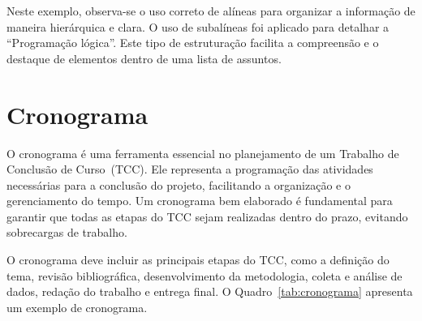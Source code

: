 \documentclass[
    12pt
    ,oneside
    ,a4paper
    ,chapter=TITLE
    ,section=TITLE
    ,sumario=abnt-6027-2012]{abntex2}
\begin{document}
Neste exemplo, observa-se o uso correto de alíneas para organizar a informação de maneira hierárquica e clara. O uso de subalíneas foi aplicado para detalhar a ``Programação lógica''. Este tipo de estruturação facilita a compreensão e o destaque de elementos dentro de uma lista de assuntos.






\chapter{Cronograma}
\label{cap:cronograma}

O cronograma é uma ferramenta essencial no planejamento de um Trabalho de Conclusão de Curso~(TCC). Ele representa a programação das atividades necessárias para a conclusão do projeto, facilitando a organização e o gerenciamento do tempo. Um cronograma bem elaborado é fundamental para garantir que todas as etapas do TCC sejam realizadas dentro do prazo, evitando sobrecargas de trabalho.

O cronograma deve incluir as principais etapas do TCC, como a definição do tema, revisão bibliográfica, desenvolvimento da metodologia, coleta e análise de dados, redação do trabalho e entrega final. O Quadro~\ref{tab:cronograma} apresenta um exemplo de cronograma.
\end{document}

